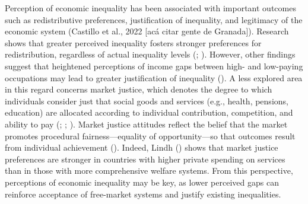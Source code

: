 \documentclass[
  12pt,
]{article}
\begin{document}
Perception of economic inequality has been associated with important
outcomes such as redistributive preferences, justification of
inequality, and legitimacy of the economic system (Castillo et al., 2022
{[}acá citar gente de Granada{]}). Research shows that greater perceived
inequality fosters stronger preferences for redistribution, regardless
of actual inequality levels
(; ). However, other findings suggest that heightened
perceptions of income gaps between high- and low-paying occupations may
lead to greater justification of inequality
(). A less explored area in
this regard concerns market justice, which denotes the degree to which
individuals consider just that social goods and services (e.g., health,
pensions, education) are allocated according to individual contribution,
competition, and ability to pay
(;
;
). Market justice attitudes
reflect the belief that the market promotes procedural
fairness---equality of opportunity---so that outcomes result from
individual achievement ().
Indeed, Lindh () shows that market
justice preferences are stronger in countries with higher private
spending on services than in those with more comprehensive welfare
systems. From this perspective, perceptions of economic inequality may
be key, as lower perceived gaps can reinforce acceptance of free-market
systems and justify existing inequalities.
\end{document}
